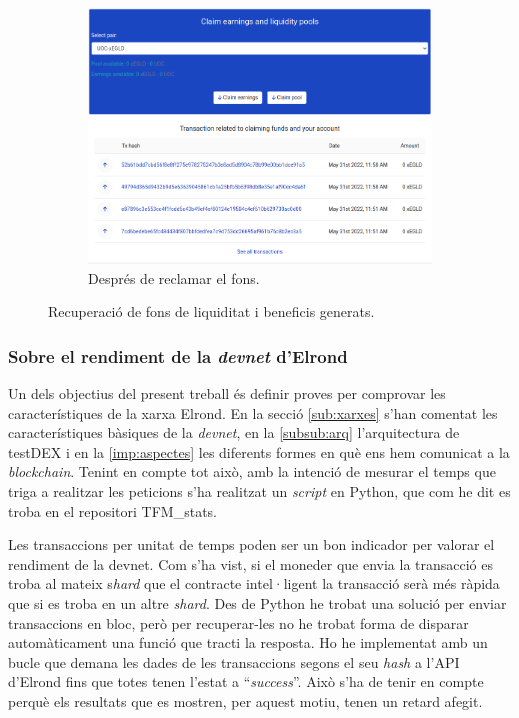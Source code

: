 \documentclass[11pt,a4paper]{article}
\begin{document}
\begin{figure}[!htb]
\begin{subfigure}[b]{0.3\textwidth}
	  \includegraphics[width=\linewidth]{imp-fons3.png}
	  \caption{Després de reclamar el fons.}\label{fig:imp-fons3}
	\end{subfigure}\hfill
	\caption{Recuperació de fons de liquiditat i beneficis generats.}
	\label{fig:imp-fons}
\end{figure}

\subsubsection{Sobre el rendiment de la \textit{devnet} d'Elrond}
Un dels objectius del present treball és definir proves per comprovar les característiques de la xarxa Elrond. En la secció \ref{sub:xarxes} s'han comentat les característiques bàsiques de la \textit{devnet}, en la \ref{subsub:arq} l'arquitectura de testDEX i en la \ref{imp:aspectes} les diferents formes en què ens hem comunicat a la \textit{blockchain}. Tenint en compte tot això, amb la intenció de mesurar el temps que triga a realitzar les peticions s'ha realitzat un \textit{script} en Python, que com he dit es troba en el repositori TFM\_stats.

Les transaccions per unitat de temps poden ser un bon indicador per valorar el rendiment de la devnet. Com s'ha vist, si el moneder que envia la transacció es troba al mateix s\textit{hard} que el contracte intel·ligent la transacció serà més ràpida que si es troba en un altre \textit{shard}. Des de Python he trobat una solució per enviar transaccions en bloc, però per recuperar-les no he trobat forma de disparar automàticament una funció que tracti la resposta. Ho he implementat amb un bucle que demana les dades de les transaccions segons el seu \textit{hash} a l'API d'Elrond fins que totes tenen l'estat a ``\textit{success}''. Això s'ha de tenir en compte perquè els resultats que es mostren, per aquest motiu, tenen un retard afegit.
\end{document}
